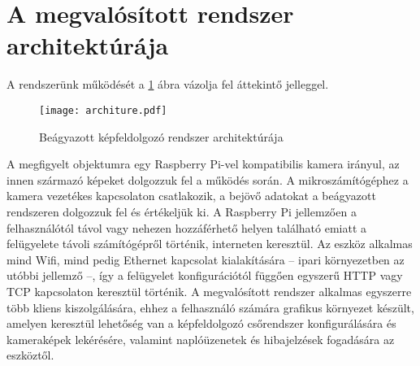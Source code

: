 \section{A megvalósított rendszer architektúrája} \label{architektura}

A rendszerünk működését a \ref{fig:placeholder_2} ábra vázolja fel áttekintő jelleggel.

\begin{figure}[h]
\texttt{[image: architure.pdf]}
\centering
\caption{Beágyazott képfeldolgozó rendszer architektúrája}
\label{fig:placeholder_2}
\end{figure}

A megfigyelt objektumra egy Raspberry Pi-vel kompatibilis kamera irányul, az innen származó képeket dolgozzuk fel a működés során. A mikroszámítógéphez a kamera vezetékes kapcsolaton csatlakozik, a bejövő adatokat a beágyazott rendszeren dolgozzuk fel és értékeljük ki. A Raspberry Pi jellemzően a felhasználótól távol vagy nehezen hozzáférhető helyen található emiatt a felügyelete távoli számítógépről történik, interneten keresztül. Az eszköz alkalmas mind Wifi, mind pedig Ethernet kapcsolat kialakítására -- ipari környezetben az utóbbi jellemző --, így a felügyelet konfigurációtól függően egyszerű HTTP vagy TCP kapcsolaton keresztül történik. A megvalósított rendszer alkalmas egyszerre több kliens kiszolgálására, ehhez a felhasználó számára grafikus környezet készült, amelyen keresztül lehetőség van a képfeldolgozó csőrendszer konfigurálására és kameraképek lekérésére, valamint naplóüzenetek és hibajelzések fogadására az eszköztől.